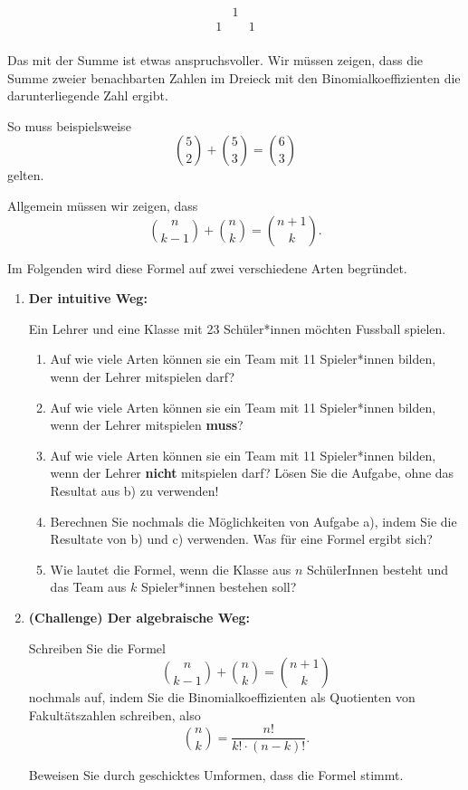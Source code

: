 \[
    \begin{array}{ccc}
          & 1 &   \\
        1 &   & 1 \\
    \end{array}
\]

Das mit der Summe ist etwas anspruchsvoller. Wir müssen zeigen, dass die Summe zweier benachbarten Zahlen im Dreieck mit den Binomialkoeffizienten die darunterliegende Zahl ergibt.

So muss beispielsweise
\[
    \binom{5}{2} + \binom{5}{3} = \binom{6}{3}
\]
gelten.

Allgemein müssen wir zeigen, dass
\[
    \binom{n}{k-1} + \binom{n}{k} = \binom{n+1}{k}.
\]

Im Folgenden wird diese Formel auf zwei verschiedene Arten begründet.

\begin{enumerate}
    \item \textbf{Der intuitive Weg:}

          Ein Lehrer und eine Klasse mit 23 Schüler*innen möchten Fussball spielen.
          \begin{enumerate}
              \item Auf wie viele Arten können sie ein Team mit 11 Spieler*innen bilden, wenn der Lehrer mitspielen darf?
              \item Auf wie viele Arten können sie ein Team mit 11 Spieler*innen bilden, wenn der Lehrer mitspielen \textbf{muss}?
              \item Auf wie viele Arten können sie ein Team mit 11 Spieler*innen bilden, wenn der Lehrer \textbf{nicht} mitspielen darf? Lösen Sie die Aufgabe, ohne das Resultat aus b) zu verwenden!
              \item Berechnen Sie nochmals die Möglichkeiten von Aufgabe a), indem Sie die Resultate von b) und c) verwenden. Was für eine Formel ergibt sich?
              \item Wie lautet die Formel, wenn die Klasse aus \(n\) SchülerInnen besteht und das Team aus \(k\) Spieler*innen bestehen soll?
          \end{enumerate}
    \item \textbf{(Challenge) Der algebraische Weg:}

          Schreiben Sie die Formel
          \[
              \binom{n}{k-1} + \binom{n}{k} = \binom{n+1}{k}
          \]
          nochmals auf, indem Sie die Binomialkoeffizienten als Quotienten von Fakultätszahlen schreiben, also
          \[
              \binom{n}{k} = \frac{n!}{k! \cdot (n-k)!}.
          \]

          Beweisen Sie durch geschicktes Umformen, dass die Formel stimmt.

\end{enumerate}





